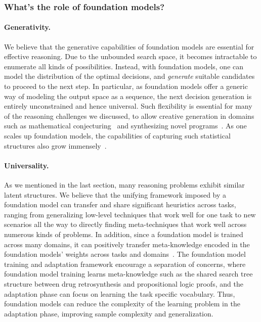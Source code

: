 \subsubsection{What's the role of foundation models?}
\label{sec:reasoning-role}

\paragraph{Generativity.} We believe that the generative capabilities of foundation models are essential for effective reasoning. Due to the unbounded search space, it becomes intractable to enumerate all kinds of possibilities. Instead, with foundation models, one can model the distribution of the optimal decisions, and \emph{generate} suitable candidates to proceed to the next step. In particular, as foundation models offer a generic way of modeling the output space as a sequence, the next decision generation is entirely unconstrained and hence universal. Such flexibility is essential for many of the reasoning challenges we discussed, to allow creative generation in domains such as mathematical conjecturing~\cite{li2021isarstep} and synthesizing novel programs~\cite{chen2021evaluating}. As one scales up foundation models, the capabilities of capturing such statistical structures also grow immensely~\citep{DBLP:journals/corr/polu2020generative}.

\paragraph{Universality.} As we mentioned in the last section, many reasoning problems exhibit similar latent structures. We believe that the unifying framework imposed by a foundation model can transfer and share significant heuristics across tasks, ranging from generalizing low-level techniques that work well for one task to new scenarios all the way to directly finding meta-techniques that work well across numerous kinds of problems. In addition, since a foundation model is trained across many domains, it can positively transfer meta-knowledge encoded in the foundation models' weights across tasks and domains~\citep{papadimitriou2020learning, lime,DBLP:journals/corr/abs-2103-05247}. The foundation model training and adaptation framework encourage a separation of concerns, where foundation model training learns meta-knowledge such as the shared search tree structure between drug retrosynthesis and propositional logic proofs, and the adaptation phase can focus on learning the task specific vocabulary. Thus, foundation models can reduce the complexity of the learning problem in the adaptation phase, improving sample complexity and generalization.

